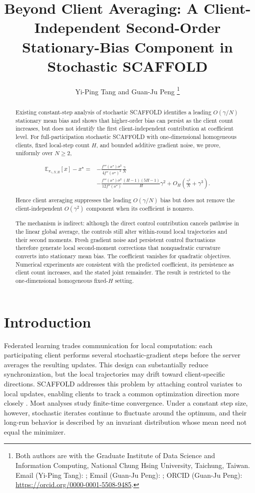 \documentclass[11pt]{article}
\title{Beyond Client Averaging: A Client-Independent Second-Order Stationary-Bias Component in Stochastic SCAFFOLD}
\author{Yi-Ping Tang and Guan-Ju Peng
\thanks{Both authors are with the Graduate Institute of Data Science and Information Computing,
National Chung Hsing University, Taichung, Taiwan.
Email (Yi-Ping Tang): \email{s4109053021@gmail.com};
Email (Guan-Ju Peng): \email{gjpeng@email.nchu.edu.tw};
ORCID (Guan-Ju Peng): \url{https://orcid.org/0000-0001-5508-9485}.}
}
\date{}
\theoremstyle{definition}
\newcommand{\Scaf}{\textnormal{\textsc{SCAFFOLD}}}
\begin{document}
\maketitle
\begin{abstract}

Existing constant-step analysis of stochastic \Scaf{} identifies a leading $O(\gamma/N)$ stationary mean bias and shows that higher-order bias can persist as the client count increases, but does not identify the first client-independent contribution at coefficient level. For full-participation stochastic \Scaf{} with one-dimensional homogeneous clients, fixed local-step count $H$, and bounded additive gradient noise, we prove, uniformly over $N\ge2$,

$$
\begin{aligned}
\mathbb{E}_{\pi_{\gamma,N,H}}[x]-x^\star
={}&
-\frac{f'''(x^\star)\sigma^2}{4f''(x^\star)^2}\frac{\gamma}{N}\\
&-
\frac{f'''(x^\star)\sigma^2}{12f''(x^\star)}
\frac{(H-1)(5H-1)}{H}\gamma^2
+O_H\!\left(\frac{\gamma^2}{N}+\gamma^3\right).
\end{aligned}
$$

Hence client averaging suppresses the leading $O(\gamma/N)$ bias but does not remove the client-independent $O(\gamma^2)$ component when its coefficient is nonzero.

The mechanism is indirect: although the direct control contribution cancels pathwise in the linear global average, the controls still alter within-round local trajectories and their second moments. Fresh gradient noise and persistent control fluctuations therefore generate local second-moment corrections that nonquadratic curvature converts into stationary mean bias. The coefficient vanishes for quadratic objectives. Numerical experiments are consistent with the predicted coefficient, its persistence as client count increases, and the stated joint remainder. The result is restricted to the one-dimensional homogeneous fixed-$H$ setting.

\end{abstract}

\section{Introduction}
\label{sec:intro}

Federated learning trades communication for local computation: each participating client performs several stochastic-gradient steps before the server averages the resulting updates. This design can substantially reduce synchronization, but the local trajectories may drift toward client-specific directions. \Scaf{} addresses this problem by attaching control variates to local updates, enabling clients to track a common optimization direction more closely \citep{karimireddy2020scaffold}. Most analyses study finite-time convergence. Under a constant step size, however, stochastic iterates continue to fluctuate around the optimum, and their long-run behavior is described by an invariant distribution whose mean need not equal the minimizer.
\end{document}

